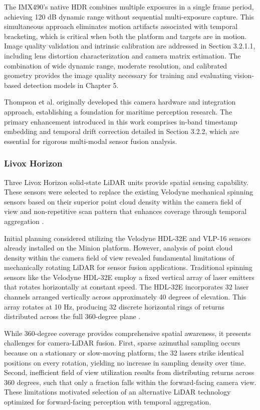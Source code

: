 \documentclass{erauthesis}
\begin{document}
The IMX490's native \ac{HDR} combines multiple exposures in a single frame period, achieving 120 dB dynamic range without sequential multi-exposure capture.
This simultaneous approach eliminates motion artifacts associated with temporal bracketing, which is critical when both the platform and targets are in motion.
Image quality validation and intrinsic calibration are addressed in Section 3.2.1.1, including lens distortion characterization and camera matrix estimation.
The combination of wide dynamic range, moderate resolution, and calibrated geometry provides the image quality necessary for training and evaluating vision-based detection models in Chapter 5.

Thompson et al. \cite{thompson2023} originally developed this camera hardware and integration approach, establishing a foundation for maritime perception research.
The primary enhancement introduced in this work comprises in-band timestamp embedding and temporal drift correction detailed in Section 3.2.2, which are essential for rigorous multi-modal sensor fusion analysis.

            \subsubsection{Livox Horizon}

Three Livox Horizon solid-state \ac{LiDAR} units provide spatial sensing capability.
These sensors were selected to replace the existing Velodyne mechanical spinning sensors based on their superior point cloud density within the camera field of view and non-repetitive scan pattern that enhances coverage through temporal aggregation \cite{thompson2023}.

Initial planning considered utilizing the Velodyne HDL-32E and VLP-16 sensors already installed on the Minion platform.
However, analysis of point cloud density within the camera field of view revealed fundamental limitations of mechanically rotating \ac{LiDAR} for sensor fusion applications.
Traditional spinning sensors like the Velodyne HDL-32E employ a fixed vertical array of laser emitters that rotates horizontally at constant speed.
The HDL-32E incorporates 32 laser channels arranged vertically across approximately 40 degrees of elevation.
This array rotates at 10 Hz, producing 32 discrete horizontal rings of returns distributed across the full 360-degree plane \cite{thompson2023}.

While 360-degree coverage provides comprehensive spatial awareness, it presents challenges for camera-\ac{LiDAR} fusion.
First, sparse azimuthal sampling occurs because on a stationary or slow-moving platform, the 32 lasers strike identical positions on every rotation, yielding no increase in sampling density over time.
Second, inefficient field of view utilization results from distributing returns across 360 degrees, such that only a fraction falls within the forward-facing camera view.
These limitations motivated selection of an alternative \ac{LiDAR} technology optimized for forward-facing perception with temporal aggregation.
\end{document}
